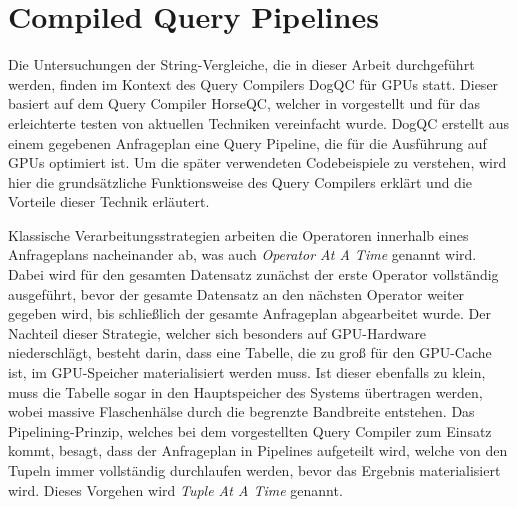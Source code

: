 \chapter{Compiled Query Pipelines}
\label{sec:pipelining}

Die Untersuchungen der String-Vergleiche, die in dieser Arbeit durchgeführt werden, finden im Kontext des Query Compilers DogQC für GPUs statt.
Dieser basiert auf dem Query Compiler HorseQC, welcher in \cite{Funke2018} vorgestellt und für das erleichterte testen von aktuellen Techniken vereinfacht wurde.
DogQC erstellt aus einem gegebenen Anfrageplan eine Query Pipeline, die für die Ausführung auf GPUs optimiert ist.
Um die später verwendeten Codebeispiele zu verstehen, wird hier die grundsätzliche Funktionsweise des Query Compilers erklärt und die Vorteile dieser Technik erläutert.

Klassische Verarbeitungsstrategien arbeiten die Operatoren innerhalb eines Anfrageplans nacheinander ab, was auch \emph{Operator At A Time} genannt wird.
Dabei wird für den gesamten Datensatz zunächst der erste Operator vollständig ausgeführt, bevor der gesamte Datensatz an den nächsten Operator weiter gegeben wird, bis schließlich der gesamte Anfrageplan abgearbeitet wurde.
Der Nachteil dieser Strategie, welcher sich besonders auf GPU-Hardware niederschlägt, besteht darin, dass eine Tabelle, die zu groß für den GPU-Cache ist, im GPU-Speicher materialisiert werden muss.
Ist dieser ebenfalls zu klein, muss die Tabelle sogar in den Hauptspeicher des Systems übertragen werden, wobei massive Flaschenhälse durch die begrenzte Bandbreite entstehen.
Das Pipelining-Prinzip, welches bei dem vorgestellten Query Compiler zum Einsatz kommt, besagt, dass der Anfrageplan in Pipelines aufgeteilt wird, welche von den Tupeln immer vollständig durchlaufen werden, bevor das Ergebnis materialisiert wird.
Dieses Vorgehen wird \emph{Tuple At A Time} genannt.

